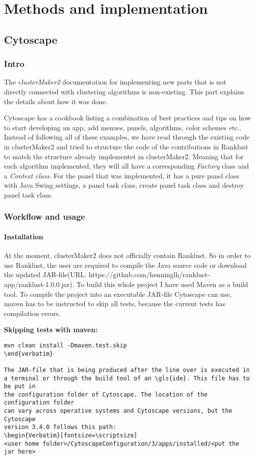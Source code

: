 \part{Methods and implementation}
\label{pa:methods}
\chapter{Cytoscape}
\section{Intro}
The \textit{clusterMaker2} documentation for implementing new parts that is not
directly connected with clustering algorithms is non-existing. This part
explains the details about how it was done.

Cytoscape has a cookbook\cite{cytoscape-cookbook} listing a combination of best
practices and tips on how to start developing an app, add menues, panels,
algorithms, color schemes etc.. Instead of following all of these examples, we
have read through the existing code in clusterMaker2\cite{cm2-github} and tried
to structure the code of the contributions in Ranklust to match the structure
already implementet in clusterMaker2. Meaning that for each algorithm
implemented, they will all have a corresponding \textit{Factory} class and a
\textit{Context class}. For the panel that was implemented, it has a pure panel
class with Java Swing\cite{java-swing} settings, a panel task class, create
panel task class and destroy panel task class.

\section{Workflow and usage}
\subsection{Installation}
At the moment, clusterMaker2 does not officially contain Ranklust. So in order
to use Ranklust, the user are required to compile the Java source code or
download the updated JAR-file\cite{jar}(URL:
https://github.com/henninglh/ranklust-app/ranklust-1.0.0.jar). To build this
whole project I have used Maven as a build tool\cite{maven}. To compile the
project into an executable JAR-file Cytoscape can use, \gls{maven} has to be
instructed to skip all tests, because the current tests has compilation errors.

\textbf{Skipping tests with maven:}
\begin{Verbatim}[fontsize=\scriptsize]
mvn clean install -Dmaven.test.skip
\end{verbatim}

The JAR-file that is being produced after the line over is executed in
a terminal or through the build tool of an \gls{ide}. This file has to be put in
the configuration folder of Cytoscape. The location of the configuration folder
can vary across operative systems and Cytoscape versions, but the Cytoscape
version 3.4.0 follows this path:
\begin{Verbatim}[fontsize=\scriptsize]
<user home folder>/CytoscapeConfiguration/3/apps/installed/<put the jar here>
\end{Verbatim}

